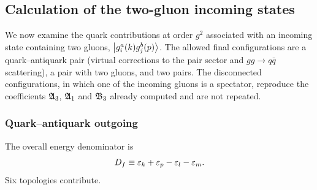 \subsection{Calculation of the two-gluon incoming states}
\label{sec:wf-gg}

We now examine the quark contributions at order $g^{2}$ associated with an incoming state
containing two gluons, $\left|g^{a}_{i}(k)g^{b}_{j}(p)\right\rangle$. The allowed final configurations are a
quark--antiquark pair (virtual corrections to the pair sector and $gg\to q\bar q$ scattering),
a pair with two gluons, and two pairs. The disconnected configurations, in which one of the
incoming gluons is a spectator, reproduce the coefficients $\mathfrak{A}_{3}$, $\mathfrak{A}_{1}$ and $\mathfrak{B}_{3}$
already computed and are not repeated.

\subsubsection{Quark--antiquark outgoing}

The overall energy denominator is
\begin{equation}
D_{f}\equiv\varepsilon_{k}+\varepsilon_{p}-\varepsilon_{l}-\varepsilon_{m}.
\end{equation}
Six topologies contribute.

